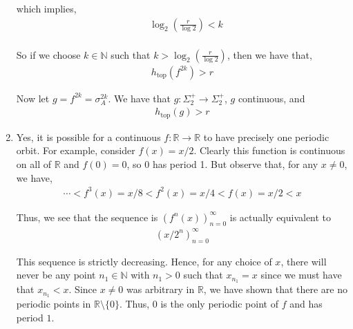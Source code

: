 \documentclass[12pt]{article}
\begin{document}
\begin{enumerate}[label=(\alph*)]
which implies,
\begin{align*}
&\log_2 \left(\frac{r}{\log 2}\right) < k\\
\end{align*}

So if we choose $k \in \mathbb{N}$ such that $k > \log_2 \left(\frac{r}{\log 2}\right)$, then we have that,
\begin{align*}
h_{\text{top}}(f^{2k}) > r
\end{align*}

Now let $g = f^{2k} = \sigma_A^{2k}$. We have that $g: \Sigma_2^+ \to \Sigma_2^+$, $g$ continuous, and
\begin{align*}
h_{\text{top}}(g) > r
\end{align*}

\item Yes, it is possible for a continuous $f: \mathbb{R} \to \mathbb{R}$ to have precisely one periodic orbit. For example, consider $f(x) = x/2$. Clearly this function is continuous on all of $\mathbb{R}$ and $f(0) = 0$, so $0$ has period 1. But observe that, for any $x \neq 0$, we have,
\begin{align*}
\cdots < f^3(x) = x/8 < f^2(x) = x/4 < f(x) = x/2 < x
\end{align*}

Thus, we see that the sequence is $(f^n(x))_{n=0}^{\infty}$ is actually equivalent to 
\begin{align*}
(x/2^n)_{n=0}^{\infty}
\end{align*}

This sequence is strictly decreasing. Hence, for any choice of $x$, there will never be any point $n_1 \in \mathbb{N}$ with $n_1 > 0$ such that $x_{n_1} = x$ since we must have that $x_{n_1} < x$. Since $x \neq 0$ was arbitrary in $\mathbb{R}$, we have shown that there are no periodic points in $\mathbb{R} \setminus \{0\}$. Thus, $0$ is the only periodic point of $f$ and has period $1$.
\end{enumerate}
\end{document}
